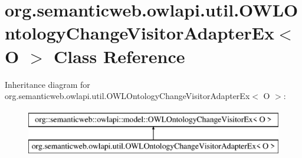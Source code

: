 \hypertarget{classorg_1_1semanticweb_1_1owlapi_1_1util_1_1_o_w_l_ontology_change_visitor_adapter_ex_3_01_o_01_4}{\section{org.\-semanticweb.\-owlapi.\-util.\-O\-W\-L\-Ontology\-Change\-Visitor\-Adapter\-Ex$<$ O $>$ Class Reference}
\label{classorg_1_1semanticweb_1_1owlapi_1_1util_1_1_o_w_l_ontology_change_visitor_adapter_ex_3_01_o_01_4}
}
Inheritance diagram for org.\-semanticweb.\-owlapi.\-util.\-O\-W\-L\-Ontology\-Change\-Visitor\-Adapter\-Ex$<$ O $>$\-:\begin{figure}[H]
\begin{center}
\leavevmode
\includegraphics[height=2.000000cm]{classorg_1_1semanticweb_1_1owlapi_1_1util_1_1_o_w_l_ontology_change_visitor_adapter_ex_3_01_o_01_4}
\end{center}
\end{figure}
